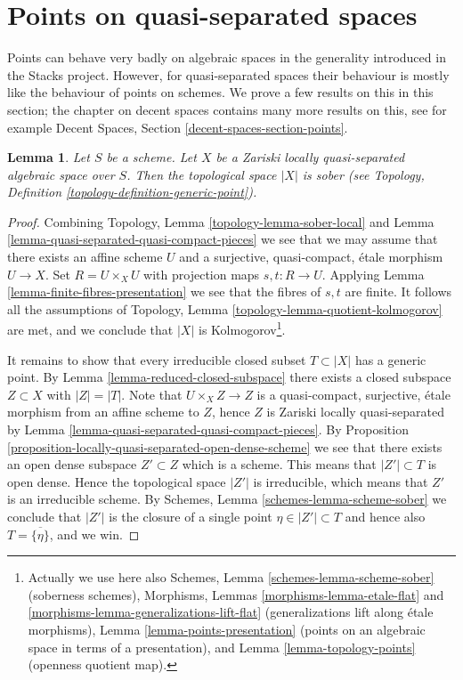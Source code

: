 \documentclass{stacks-project}
\theoremstyle{plain}
\newtheorem{lemma}[subsection]{Lemma}
\theoremstyle{definition}
\theoremstyle{remark}
\numberwithin{equation}{subsection}
\begin{document}
\section{Points on quasi-separated spaces}
\label{section-points-quasi-separated}

\noindent
Points can behave very badly on algebraic spaces in the generality introduced
in the Stacks project. However, for quasi-separated spaces their behaviour
is mostly like the behaviour of points on schemes. We prove a few results
on this in this section; the chapter on decent spaces contains many more
results on this, see for example
Decent Spaces, Section \ref{decent-spaces-section-points}.

\begin{lemma}
\label{lemma-quasi-separated-sober}
Let $S$ be a scheme. Let $X$ be a Zariski locally quasi-separated
algebraic space over $S$. Then the topological space $|X|$ is sober (see
Topology, Definition \ref{topology-definition-generic-point}).
\end{lemma}

\begin{proof}
Combining
Topology, Lemma \ref{topology-lemma-sober-local}
and
Lemma \ref{lemma-quasi-separated-quasi-compact-pieces}
we see that we may assume that there exists an affine scheme $U$
and a surjective, quasi-compact, \'etale morphism $U \to X$.
Set $R = U \times_X U$ with projection maps $s, t : R \to U$. Applying
Lemma \ref{lemma-finite-fibres-presentation}
we see that the fibres of $s, t$ are finite. It follows all the assumptions of
Topology, Lemma \ref{topology-lemma-quotient-kolmogorov}
are met, and we conclude that $|X|$ is Kolmogorov\footnote{
Actually we use here also
Schemes, Lemma \ref{schemes-lemma-scheme-sober} (soberness schemes),
Morphisms, Lemmas \ref{morphisms-lemma-etale-flat}
and \ref{morphisms-lemma-generalizations-lift-flat} (generalizations
lift along \'etale morphisms),
Lemma \ref{lemma-points-presentation} (points on an algebraic space in
terms of a presentation), and
Lemma \ref{lemma-topology-points} (openness quotient map).}.

\medskip\noindent
It remains to show that every irreducible closed subset
$T \subset |X|$ has a generic point. By
Lemma \ref{lemma-reduced-closed-subspace}
there exists a closed subspace $Z \subset X$ with $|Z| = |T|$.
Note that $U \times_X Z \to Z$ is a quasi-compact, surjective, \'etale
morphism from an affine scheme to $Z$, hence $Z$ is Zariski locally
quasi-separated by
Lemma \ref{lemma-quasi-separated-quasi-compact-pieces}.
By
Proposition \ref{proposition-locally-quasi-separated-open-dense-scheme}
we see that there exists an open dense subspace $Z' \subset Z$
which is a scheme. This means that $|Z'| \subset T$ is open dense.
Hence the topological space $|Z'|$ is irreducible, which means that
$Z'$ is an irreducible scheme. By
Schemes, Lemma \ref{schemes-lemma-scheme-sober}
we conclude that $|Z'|$ is the closure of a single point
$\eta \in |Z'| \subset T$ and hence also $T = \overline{\{\eta\}}$, and we win.
\end{proof}
\end{document}

